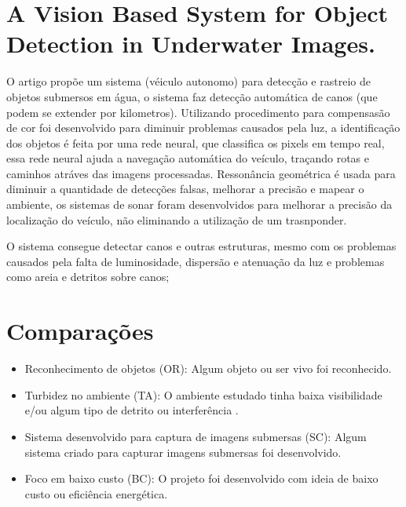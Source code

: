 \section{A Vision Based System for Object Detection in Underwater Images.}

O artigo propõe um sistema (véiculo autonomo) para detecção e rastreio de objetos submersos em água, o sistema faz detecção automática de canos (que podem se extender por kilometros). Utilizando procedimento para compensasão de cor foi desenvolvido para diminuir problemas causados pela luz, a identificação dos objetos é feita por uma rede neural, que classifica os pixels em tempo real, essa rede neural ajuda a navegação automática do veículo, traçando rotas e caminhos atráves das imagens processadas. Ressonância  geométrica é usada para diminuir a quantidade de detecções falsas, melhorar a precisão e mapear o ambiente, os sistemas de sonar foram desenvolvidos para melhorar a precisão da localização do veículo, não eliminando a utilização de um trasnponder.

O sistema consegue detectar canos e outras estruturas, mesmo com os problemas causados pela falta de luminosidade, dispersão e atenuação da luz e problemas como areia e detritos sobre canos; 

\section{Comparações}
\begin{itemize}
\item Reconhecimento de objetos (OR): Algum objeto ou ser vivo foi reconhecido.
\item Turbidez no ambiente (TA): O ambiente estudado tinha baixa visibilidade e/ou algum tipo de detrito ou interferência .
\item Sistema desenvolvido para captura de imagens submersas (SC): Algum sistema criado para capturar imagens submersas foi desenvolvido.
\item Foco em baixo custo (BC): O projeto foi desenvolvido com ideia de baixo custo ou eficiência energética. 
\end{itemize}


